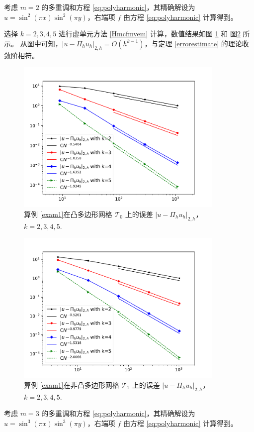 \begin{example}\label{exam1}
考虑 $m=2$ 的多重调和方程 \eqref{eq:polyharmonic}，其精确解设为 $u = \sin^2(\pi x)\sin^2(\pi y)$，右端项 $f$ 由方程 \eqref{eq:polyharmonic} 计算得到。
\end{example}

选择 $k = 2, 3, 4, 5$ 进行虚单元方法 \eqref{Hmcfmvem} 计算，数值结果如图
 \ref{fig:H2error_convex} 和 图\ref{fig:H2error_nonconvex} 所示。
从图中可知，$|u - \Pi_h u_h|_{2, h} = O(h^{k-1})$，与定理 \ref{errorestimate} 的理论收敛阶相符。

\begin{figure}[htbp]
\centering
\includegraphics[width=10cm]{./figures/hmvem/H2_convex.pdf}
\caption{算例 \ref{exam1}在凸多边形网格 $\mathcal{T}_0$ 上的误差 $|u - \Pi_h u_h|_{2, h}$，$k = 2, 3, 4, 5$.}
\label{fig:H2error_convex}
\end{figure}

\begin{figure}[htbp]
\centering
\includegraphics[width=10cm]{./figures/hmvem/H2_nonconvex.pdf}
\caption{算例 \ref{exam1}在非凸多边形网格 $\mathcal{T}_1$ 上的误差 $|u - \Pi_h u_h|_{2, h}$，$k = 2, 3, 4, 5$.}
\label{fig:H2error_nonconvex}
\end{figure}
\begin{example}\label{exam2}
考虑 $m=3$ 的多重调和方程 \eqref{eq:polyharmonic}，其精确解设为 $u = \sin^3(\pi x)\sin^3(\pi y)$，右端项 $f$ 由方程 \eqref{eq:polyharmonic} 计算得到。
\end{example}

